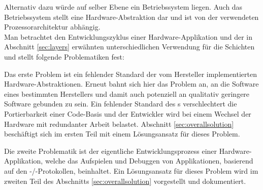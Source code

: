     Alternativ dazu würde auf selber Ebene ein Betriebssystem liegen. Auch das Betriebssystem stellt eine
    Hardware-Abstraktion dar und ist von der verwendeten Prozessorarchitektur abhängig.
    \\

    Man betrachtet den Entwicklungszyklus einer Hardware-Applikation und der in Abschnitt \ref{sec:layers} erwähnten
    unterschiedlichen Verwendung für die Schichten und stellt folgende Problematiken fest:

    Das erste Problem ist ein fehlender Standard der vom Hersteller implementierten Hardware-Abstraktionen.
    Erneut bahnt sich hier das Problem an, an die Software eines bestimmten Herstellers und damit auch potenziell
    an qualitativ geringere Software gebunden zu sein. Ein fehlender Standard des s verschlechtert die Portierbarkeit
    einer Code-Basis und der Entwickler wird bei einem Wechsel der Hardware mit redundanter Arbeit belastet.
    Abschnitt \ref{sec:overallsolution} beschäftigt sich im ersten Teil mit einem Lösungsansatz für dieses Problem.

    Die zweite Problematik ist der eigentliche Entwicklungsprozess einer Hardware-Applikation, welche das Aufspielen
    und Debuggen von Applikationen, basierend auf den -/-Protokollen, beinhaltet. Ein Lösungsansatz für dieses
    Problem wird im zweiten Teil des Abschnitts \ref{sec:overallsolution} vorgestellt und dokumentiert.